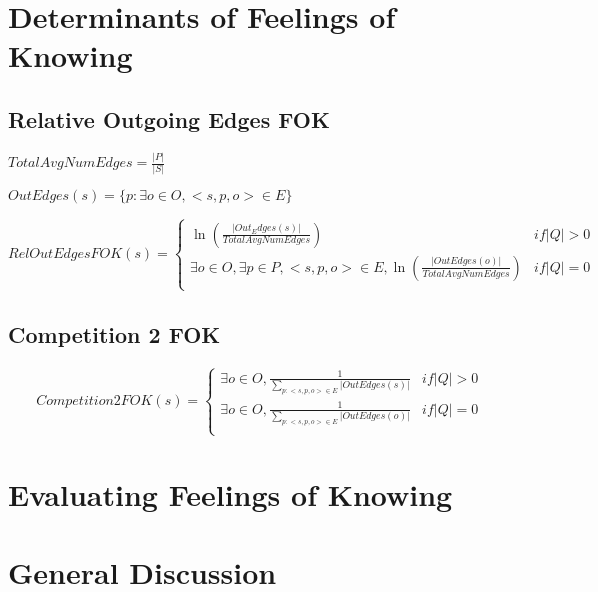 \documentclass[10pt,letterpaper]{article}
\begin{document}
\section{Determinants of Feelings of Knowing}
\subsection{Relative Outgoing Edges FOK}
$TotalAvgNumEdges= \frac{|P|}{|S|}$

\noindent$OutEdges(s) = \{p : \exists o{\in}O, <s, p, o>{\in}E \}$

\noindent$$RelOutEdgesFOK(s) =
\begin{cases}
				\ln (\frac{|Out_Edges(s)|}{TotalAvgNumEdges}) & {if |Q| > 0} \\
				\exists o{\in}O, \exists p{\in}P, <s, p, o>{\in}E, \ln(\frac{|OutEdges(o)|}{TotalAvgNumEdges}) & {if |Q| = 0} \\
\end{cases}
$$

\subsection{Competition 2 FOK}
\noindent$$Competition2FOK(s) =
\begin{cases}
				\exists o{\in}O, \frac{1}{\sum\limits_{p: <s, p, o> \in E} {|OutEdges(s)|}} & {if |Q| > 0} \\
				\exists o{\in}O, \frac{1}{\sum\limits_{p: <s, p, o> \in E} {|OutEdges(o)|}} & {if |Q| = 0} \\
\end{cases}
$$



\section{Evaluating Feelings of Knowing}

\section{General Discussion}


%



\setlength{\bibleftmargin}{.125in}
\setlength{\bibindent}{-\bibleftmargin}


\end{document}
